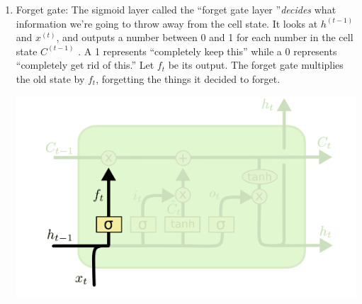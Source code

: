 \begin{enumerate}
    \item Forget gate: The sigmoid layer called the “forget gate layer ”\textit{decides} what information we’re going to throw away from the cell state. It looks at $h^{(t-1)}$ and $x^{(t)}$, and outputs a number between 0 and 1 for each number in the cell state $C^{(t-1)}$ . A 1 represents “completely keep this” while a 0 represents “completely get rid of this.” Let $f_t$ be its output. The forget gate multiplies the old state by $f_t$, forgetting the things it decided to forget.
    \begin{center}
        \includegraphics[]{images/forget-gate.png}
    \end{center}


\end{enumerate}
